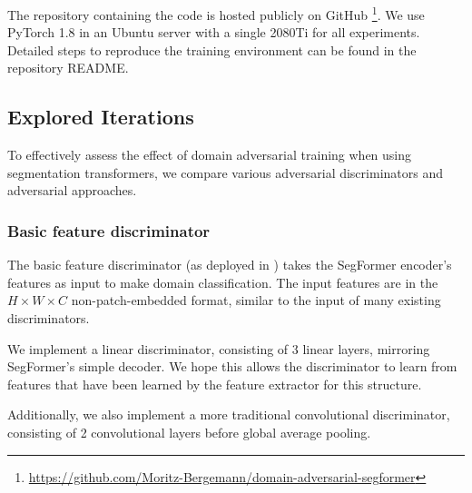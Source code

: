 \documentclass[a4paper,12pt]{report}
\begin{document}
The repository containing the code is hosted publicly on GitHub \footnote{\url{https://github.com/Moritz-Bergemann/domain-adversarial-segformer}}. We use PyTorch 1.8 in an Ubuntu server with a single 2080Ti for all experiments. Detailed steps to reproduce the training environment can be found in the repository README.

\subsection{Explored Iterations}
To effectively assess the effect of domain adversarial training when using segmentation transformers, we compare various adversarial discriminators and adversarial approaches.

\subsubsection{Basic feature discriminator}
The basic feature discriminator (as deployed in \cite{hoffman_fcns_2016}) takes the SegFormer encoder's features as input to make domain classification. The input features are in the $H \times W \times C$ non-patch-embedded format, similar to the input of many existing discriminators.

We implement a linear discriminator, consisting of 3 linear layers, mirroring SegFormer's simple decoder. We hope this allows the discriminator to learn from features that have been learned by the feature extractor for this structure.

Additionally, we also implement a more traditional convolutional discriminator, consisting of 2 convolutional layers before global average pooling.
\end{document}
